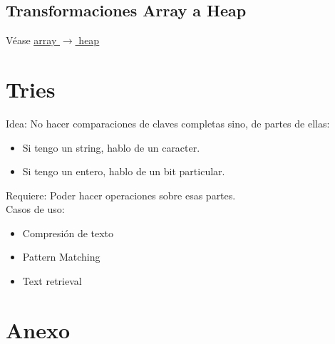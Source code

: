 \documentclass[10pt,a4paper]{article}
\begin{document}
\subsection*{Transformaciones Array a Heap}
Véase \hyperref[subsec:array_2_heap]{\underline{array $\rightarrow$ heap}}
\section*{Tries}
Idea: No hacer comparaciones de claves completas sino, de partes de ellas: \begin{itemize}
    \item Si tengo un string, hablo de un caracter.
    \item Si tengo un entero, hablo de un bit particular.
\end{itemize}
Requiere: Poder hacer operaciones sobre esas partes. \\
Casos de uso:
\begin{itemize}
    \item Compresión de texto
    \item Pattern Matching
    \item Text retrieval
\end{itemize}
\section*{Anexo}
\end{document}
